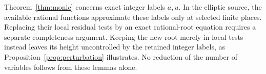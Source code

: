 \documentclass[11pt,a4paper]{article}
\begin{document}
Theorem~\ref{thm:monic} concerns exact integer labels $a,u$.
In the elliptic source, the available rational functions approximate
these labels only at selected finite places. Replacing their local
residual tests by an exact rational-root equation requires a separate
completeness argument. Keeping the new root merely in local tests
instead leaves its height uncontrolled by the retained integer labels,
as Proposition~\ref{prop:perturbation} illustrates. No reduction of
the number of variables follows from these lemmas alone.
\end{document}
